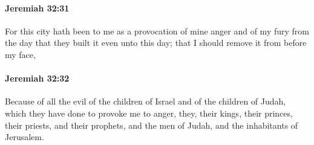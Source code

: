 		\paragraph{Jeremiah 32:31} %
			\label{JEREMIAH-32-31}

			For this city hath been to me as a provocation of mine anger and of my fury from the day that they built it even unto this day; that I should remove it from before my face,


		\paragraph{Jeremiah 32:32} %
			\label{JEREMIAH-32-32}

			Because of all the evil of the children of Israel and of the children of Judah, which they have done to provoke me to anger, they, their kings, their princes, their priests, and their prophets, and the men of Judah, and the inhabitants of Jerusalem.

